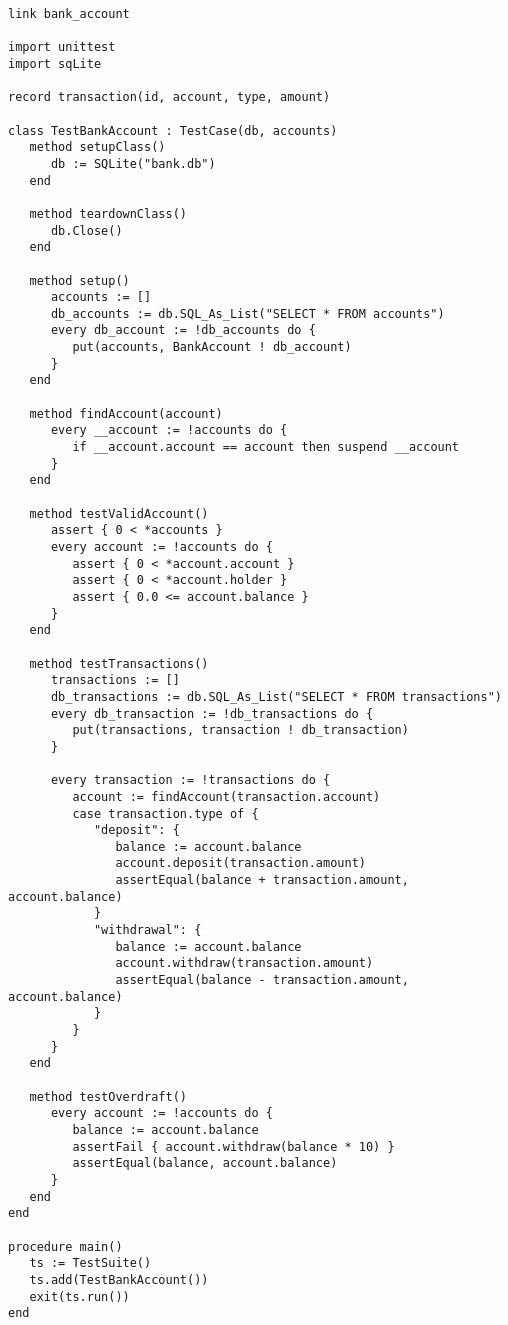 \documentclass[letterpaper,12pt]{article}
\begin{document}
\bigskip{}
\begin{verbatim}
link bank_account

import unittest
import sqLite

record transaction(id, account, type, amount)

class TestBankAccount : TestCase(db, accounts)
   method setupClass()
      db := SQLite("bank.db")
   end

   method teardownClass()
      db.Close()
   end

   method setup()
      accounts := []
      db_accounts := db.SQL_As_List("SELECT * FROM accounts")
      every db_account := !db_accounts do {
         put(accounts, BankAccount ! db_account)
      }
   end

   method findAccount(account)
      every __account := !accounts do {
         if __account.account == account then suspend __account
      }
   end

   method testValidAccount()
      assert { 0 < *accounts }
      every account := !accounts do {
         assert { 0 < *account.account }
         assert { 0 < *account.holder }
         assert { 0.0 <= account.balance }
      }
   end

   method testTransactions()
      transactions := []
      db_transactions := db.SQL_As_List("SELECT * FROM transactions")
      every db_transaction := !db_transactions do {
         put(transactions, transaction ! db_transaction)
      }

      every transaction := !transactions do {
         account := findAccount(transaction.account)
         case transaction.type of {
            "deposit": {
               balance := account.balance
               account.deposit(transaction.amount)
               assertEqual(balance + transaction.amount, account.balance)
            }
            "withdrawal": {
               balance := account.balance
               account.withdraw(transaction.amount)
               assertEqual(balance - transaction.amount, account.balance)
            }
         }
      }
   end

   method testOverdraft()
      every account := !accounts do {
         balance := account.balance
         assertFail { account.withdraw(balance * 10) }
         assertEqual(balance, account.balance)
      }
   end
end

procedure main()
   ts := TestSuite()
   ts.add(TestBankAccount())
   exit(ts.run())
end
\end{verbatim}
\end{document}
